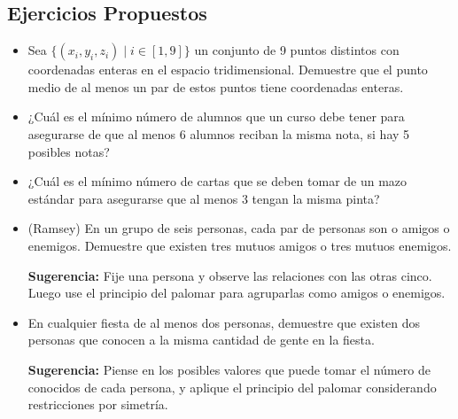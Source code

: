 \subsection*{Ejercicios Propuestos}
\begin{itemize}
\item Sea $\{(x_i,y_i,z_i) \mid i \in [1,9]\}$ un conjunto de 9 puntos distintos con coordenadas enteras en el espacio tridimensional. Demuestre que el punto medio de al menos un par de estos puntos tiene coordenadas enteras.
 \item ¿Cuál es el mínimo número de alumnos que un curso debe tener para asegurarse de que al menos 6 alumnos reciban la misma nota, si hay 5 posibles notas?
  \item ¿Cuál es el mínimo número de cartas que se deben tomar de un mazo estándar para asegurarse que al menos 3 tengan la misma pinta?
\item (Ramsey) En un grupo de seis personas, cada par de personas son o amigos o enemigos. Demuestre que existen tres mutuos amigos o tres mutuos enemigos.

\textbf{Sugerencia:} Fije una persona y observe las relaciones con las otras cinco. Luego use el principio del palomar para agruparlas como amigos o enemigos.

\item En cualquier fiesta de al menos dos personas, demuestre que existen dos personas que conocen a la misma cantidad de gente en la fiesta.
  
\textbf{Sugerencia:} Piense en los posibles valores que puede tomar el número de conocidos de cada persona, y aplique el principio del palomar considerando restricciones por simetría.


\end{itemize}